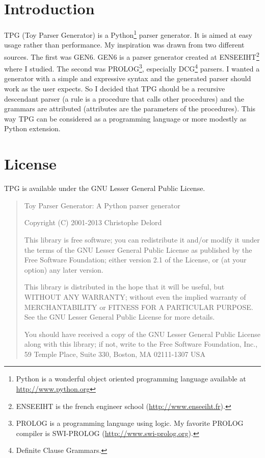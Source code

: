 \section{Introduction}

TPG (Toy Parser Generator) is a Python\footnote{Python is a wonderful object oriented programming language available at \url{http://www.python.org}} parser generator.
It is aimed at easy usage rather than performance.
My inspiration was drawn from two different sources.
The first was GEN6. GEN6 is a parser generator created at ENSEEIHT\footnote{ENSEEIHT is the french engineer school (\url{http://www.enseeiht.fr}).} where I studied.
The second was PROLOG\footnote{PROLOG is a programming language using logic. My favorite PROLOG compiler is SWI-PROLOG (\url{http://www.swi-prolog.org}).}, especially DCG\footnote{Definite Clause Grammars.} parsers.
I wanted a generator with a simple and expressive syntax and the generated parser should work as the user expects. So I decided that TPG should be a recursive descendant parser (a rule is a procedure that calls other procedures) and the grammars are attributed (attributes are the parameters of the procedures).
This way TPG can be considered as a programming language or more modestly as Python extension.

\section{License}

TPG is available under the GNU Lesser General Public License.

\begin{quote}
Toy Parser Generator: A Python parser generator

Copyright (C) 2001-2013 Christophe Delord

This library is free software; you can redistribute it and/or
modify it under the terms of the GNU Lesser General Public
License as published by the Free Software Foundation; either
version 2.1 of the License, or (at your option) any later version.

This library is distributed in the hope that it will be useful,
but WITHOUT ANY WARRANTY; without even the implied warranty of
MERCHANTABILITY or FITNESS FOR A PARTICULAR PURPOSE.  See the GNU
Lesser General Public License for more details.

You should have received a copy of the GNU Lesser General Public
License along with this library; if not, write to the Free Software
Foundation, Inc., 59 Temple Place, Suite 330, Boston, MA  02111-1307  USA
\end{quote}

